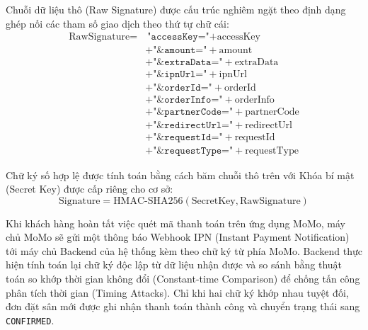 Chuỗi dữ liệu thô (Raw Signature) được cấu trúc nghiêm ngặt theo định dạng ghép nối các tham số giao dịch theo thứ tự chữ cái:
\begin{align}
    \text{RawSignature} = &\ \texttt{"accessKey="} + \text{accessKey} \nonumber \\
    &+ \texttt{"\&amount="} + \text{amount} \nonumber \\
    &+ \texttt{"\&extraData="} + \text{extraData} \nonumber \\
    &+ \texttt{"\&ipnUrl="} + \text{ipnUrl} \nonumber \\
    &+ \texttt{"\&orderId="} + \text{orderId} \nonumber \\
    &+ \texttt{"\&orderInfo="} + \text{orderInfo} \nonumber \\
    &+ \texttt{"\&partnerCode="} + \text{partnerCode} \nonumber \\
    &+ \texttt{"\&redirectUrl="} + \text{redirectUrl} \nonumber \\
    &+ \texttt{"\&requestId="} + \text{requestId} \nonumber \\
    &+ \texttt{"\&requestType="} + \text{requestType}
    \label{eq:momo_raw_signature}
\end{align}

Chữ ký số hợp lệ được tính toán bằng cách băm chuỗi thô trên với Khóa bí mật (Secret Key) được cấp riêng cho cơ sở:
\begin{equation}
    \text{Signature} = \text{HMAC-SHA256}(\text{SecretKey}, \text{RawSignature})
    \label{eq:momo_hmac}
\end{equation}

Khi khách hàng hoàn tất việc quét mã thanh toán trên ứng dụng MoMo, máy chủ MoMo sẽ gửi một thông báo Webhook IPN (Instant Payment Notification) tới máy chủ Backend của hệ thống kèm theo chữ ký từ phía MoMo. Backend thực hiện tính toán lại chữ ký độc lập từ dữ liệu nhận được và so sánh bằng thuật toán so khớp thời gian không đổi (Constant-time Comparison) để chống tấn công phân tích thời gian (Timing Attacks). Chỉ khi hai chữ ký khớp nhau tuyệt đối, đơn đặt sân mới được ghi nhận thanh toán thành công và chuyển trạng thái sang \texttt{CONFIRMED}.
